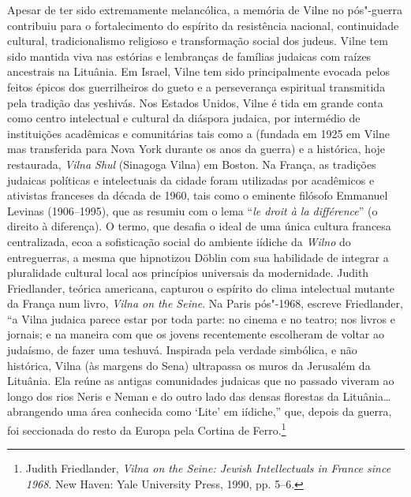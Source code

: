 Apesar de ter sido extremamente melancólica, a memória de Vilne no
pós"-guerra contribuiu para o fortalecimento do espírito da resistência
nacional, continuidade cultural, tradicionalismo religioso e
transformação social dos judeus. Vilne tem sido mantida viva nas
estórias e lembranças de famílias judaicas com raízes ancestrais na
Lituânia. Em Israel, Vilne tem sido principalmente evocada pelos feitos
épicos dos guerrilheiros do gueto e a perseverança espiritual
transmitida pela tradição das yeshivás. Nos Estados Unidos, Vilne é tida
em grande conta como centro intelectual e cultural da diáspora judaica,
por intermédio de instituições acadêmicas e comunitárias tais como a
 (fundada em 1925 em Vilne mas transferida para Nova York durante os
anos da guerra) e a histórica, hoje restaurada, \emph{Vilna Shul}
(Sinagoga Vilna) em Boston. Na França, as tradições judaicas políticas e
intelectuais da cidade foram utilizadas por acadêmicos e ativistas
franceses da década de 1960, tais como o eminente filósofo Emmanuel
Levinas (1906--1995), que as resumiu com o lema ``\emph{le droit à la
différence}'' (o direito à diferença). O termo, que desafia o ideal de
uma única cultura francesa centralizada, ecoa a sofisticação social do
ambiente iídiche da \emph{Wilno} do entreguerras, a mesma que hipnotizou
Döblin com sua habilidade de integrar a pluralidade cultural local aos
princípios universais da modernidade. Judith Friedlander, teórica
americana, capturou o espírito do clima intelectual mutante da França
num livro, \emph{Vilna on the Seine}. Na Paris pós"-1968, escreve
Friedlander, ``a Vilna judaica parece estar por toda parte: no cinema e
no teatro; nos livros e jornais; e na maneira com que os jovens
recentemente escolheram de voltar ao judaísmo, de fazer uma teshuvá.
Inspirada pela verdade simbólica, e não histórica, Vilna (às margens do
Sena) ultrapassa os muros da Jerusalém da Lituânia. Ela reúne as antigas
comunidades judaicas que no passado viveram ao longo dos rios Neris e
Neman e do outro lado das densas florestas da Lituânia\ldots{}
abrangendo uma área conhecida como `Lite' em iídiche,'' que, depois da
guerra, foi seccionada do resto da Europa pela Cortina de
Ferro.\footnote{Judith Friedlander, \emph{Vilna on the Seine: Jewish
  Intellectuals in France since 1968}. New Haven: Yale University Press,
  1990, pp. 5--6.}

